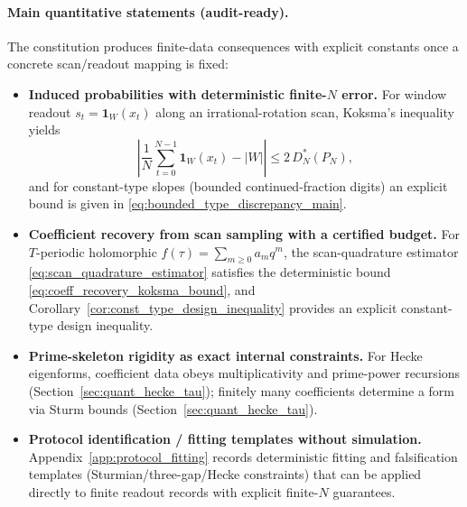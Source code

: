 \paragraph{Main quantitative statements (audit-ready).}
The constitution produces finite-data consequences with explicit constants once a concrete scan/readout mapping is fixed:
\begin{itemize}
  \item \textbf{Induced probabilities with deterministic finite-$N$ error.}
  For window readout $s_t=\mathbf{1}_W(x_t)$ along an irrational-rotation scan, Koksma's inequality yields
  \[
  \left|\frac{1}{N}\sum_{t=0}^{N-1}\mathbf{1}_W(x_t)-|W|\right|\le 2\,D_N^\ast(P_N),
  \]
  and for constant-type slopes (bounded continued-fraction digits) an explicit bound is given in \eqref{eq:bounded_type_discrepancy_main}.
  \item \textbf{Coefficient recovery from scan sampling with a certified budget.}
  For $T$-periodic holomorphic $f(\tau)=\sum_{m\ge 0}a_m q^m$, the scan-quadrature estimator \eqref{eq:scan_quadrature_estimator} satisfies the deterministic bound \eqref{eq:coeff_recovery_koksma_bound}, and Corollary~\ref{cor:const_type_design_inequality} provides an explicit constant-type design inequality.
  \item \textbf{Prime-skeleton rigidity as exact internal constraints.}
  For Hecke eigenforms, coefficient data obeys multiplicativity and prime-power recursions (Section~\ref{sec:quant_hecke_tau}); finitely many coefficients determine a form via Sturm bounds (Section~\ref{sec:quant_hecke_tau}).
  \item \textbf{Protocol identification / fitting templates without simulation.}
  Appendix~\ref{app:protocol_fitting} records deterministic fitting and falsification templates (Sturmian/three-gap/Hecke constraints) that can be applied directly to finite readout records with explicit finite-$N$ guarantees.
\end{itemize}

 

